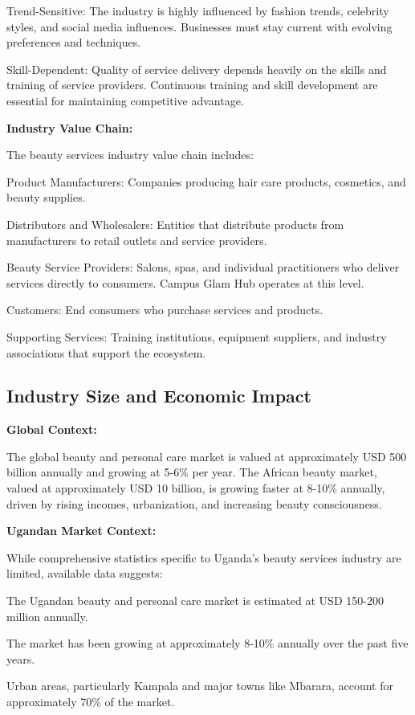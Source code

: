 Trend-Sensitive: The industry is highly influenced by fashion trends, celebrity styles, and social media influences. Businesses must stay current with evolving preferences and techniques.

Skill-Dependent: Quality of service delivery depends heavily on the skills and training of service providers. Continuous training and skill development are essential for maintaining competitive advantage.

\textbf{Industry Value Chain:}

The beauty services industry value chain includes:

Product Manufacturers: Companies producing hair care products, cosmetics, and beauty supplies.

Distributors and Wholesalers: Entities that distribute products from manufacturers to retail outlets and service providers.

Beauty Service Providers: Salons, spas, and individual practitioners who deliver services directly to consumers. Campus Glam Hub operates at this level.

Customers: End consumers who purchase services and products.

Supporting Services: Training institutions, equipment suppliers, and industry associations that support the ecosystem.

\subsection{Industry Size and Economic Impact}

\textbf{Global Context:}

The global beauty and personal care market is valued at approximately USD 500 billion annually and growing at 5-6\% per year. The African beauty market, valued at approximately USD 10 billion, is growing faster at 8-10\% annually, driven by rising incomes, urbanization, and increasing beauty consciousness.

\textbf{Ugandan Market Context:}

While comprehensive statistics specific to Uganda's beauty services industry are limited, available data suggests:

The Ugandan beauty and personal care market is estimated at USD 150-200 million annually.

The market has been growing at approximately 8-10\% annually over the past five years.

Urban areas, particularly Kampala and major towns like Mbarara, account for approximately 70\% of the market.

